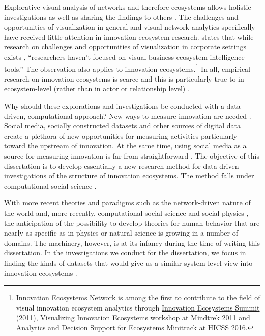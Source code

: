 Explorative visual analysis of networks and therefore ecosystems allows holistic investigations as well as sharing the findings to others \citep{Freeman2000VisualizingNetworks}. The challenges and opportunities of visualization in general and  visual network analytics specifically have received little attention in innovation ecosystem research. \cite{Basole2014} states that while research on challenges and opportunities of visualization in corporate settings exists \citep{Lam2012,Sedlmair2011}, ``researchers haven’t focused on visual business ecosystem intelligence tools.'' The observation also applies to innovation ecosystems.\footnote{Innovation Ecosystems Network is among the first to contribute to the field of visual innovation ecosystem analytics through \href{http://www.innovation-ecosystems.org/2011/05/31/ies2011/}{Innovation Ecosystems Summit (2011)}, \href{http://www.tut.fi/iislab/fi/2011/09/23/visualizing-innovation-ecosystems-mindtrek-2011/}{Visualizing Innovation Ecosystems workshop} at Mindtrek 2011 and \href{https://ien.stanford.edu/hicss2016}{Analytics and Decision Support for Ecosystems} Minitrack at HICSS 2016.} In all, empirical research on innovation ecosystems is scarce and this is particularly true to in ecosystem-level (rather than in actor or relationship level) \citep{Jarvi2016TakingReview}.

Why should these explorations and investigations be conducted with a data-driven, computational approach? New ways to measure innovation are needed \citep{Still2012ParadigmDigital}. Social media, socially constructed datasets and other sources of digital data create a plethora of new opportunities for measuring activities particularly toward the upstream of innovation. At the same time, using social media as a source for measuring innovation is far from straightforward \citep{Salonen2013ChallengesMedia}. The objective of this dissertation is to develop essentially a new research method for data-driven investigations of the structure of innovation ecosystems. The method falls under computational social science \citep{Lazer2009ComputationalScience}.

With more recent theories and paradigms such as the network-driven nature of the world \citep{Watts1999,Barabasi2003} and, more recently, computational social science \citep{Lazer2009ComputationalScience} and social physics \citep{Pentland2015}, the anticipation of the possibility to develop theories for human behavior that are nearly as specific as in physics or natural science is growing in a number of domains. The machinery, however, is at its infancy during the time of writing this dissertation. In the investigations we conduct for the dissertation, we focus in finding the kinds of datasets that would give us a similar system-level view into innovation ecosystems \citep[cf.][]{Pan2012}.

